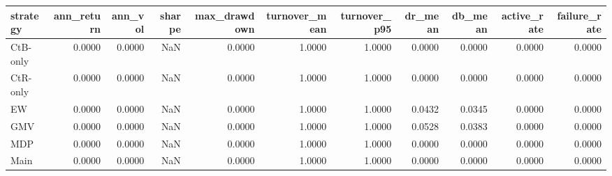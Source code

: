 \begin{tabular}{lrrrrrrrrrr}
\toprule
strategy & ann_return & ann_vol & sharpe & max_drawdown & turnover_mean & turnover_p95 & dr_mean & db_mean & active_rate & failure_rate \\
\midrule
CtB-only & 0.0000 & 0.0000 & NaN & 0.0000 & 1.0000 & 1.0000 & 0.0000 & 0.0000 & 0.0000 & 0.0000 \\
CtR-only & 0.0000 & 0.0000 & NaN & 0.0000 & 1.0000 & 1.0000 & 0.0000 & 0.0000 & 0.0000 & 0.0000 \\
EW & 0.0000 & 0.0000 & NaN & 0.0000 & 1.0000 & 1.0000 & 0.0432 & 0.0345 & 0.0000 & 0.0000 \\
GMV & 0.0000 & 0.0000 & NaN & 0.0000 & 1.0000 & 1.0000 & 0.0528 & 0.0383 & 0.0000 & 0.0000 \\
MDP & 0.0000 & 0.0000 & NaN & 0.0000 & 1.0000 & 1.0000 & 0.0000 & 0.0000 & 0.0000 & 0.0000 \\
Main & 0.0000 & 0.0000 & NaN & 0.0000 & 1.0000 & 1.0000 & 0.0000 & 0.0000 & 0.0000 & 0.0000 \\
\bottomrule
\end{tabular}
